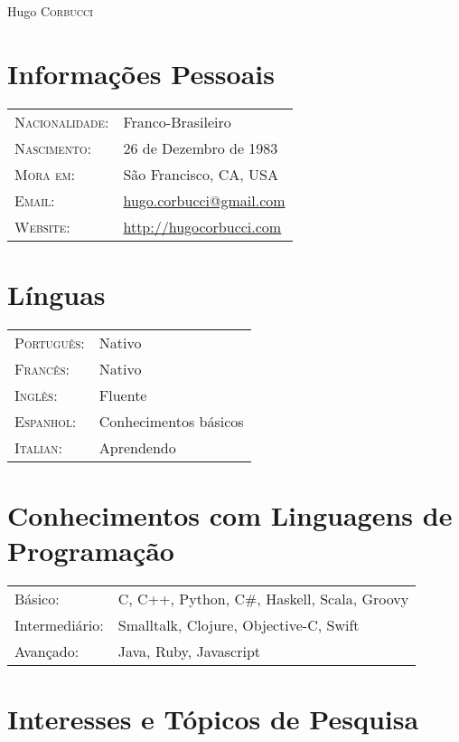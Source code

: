 \documentclass[letter,10pt]{article}
\begin{document}
\par{\centering
		{\Huge Hugo \textsc{Corbucci}
	}\bigskip\par}

\section{Informações Pessoais}

\begin{tabular}{p{2.5cm}l}
  \textsc{Nacionalidade:} & Franco-Brasileiro
  \\
  \textsc{Nascimento:} & 26 de Dezembro de 1983\\
  \textsc{Mora em:}   & São Francisco, CA, USA \\
  \textsc{Email:}     &
  \href{mailto:hugo.corbucci@gmail.com}{hugo.corbucci@gmail.com}\\
  \textsc{Website:} & \href{http://hugocorbucci.com}{http://hugocorbucci.com}
\end{tabular}

\section{Línguas}
\begin{tabular}{p{2.5cm}l}
 \textsc{Português:}&Nativo\\
 \textsc{Francês:}&Nativo\\
 \textsc{Inglês:}&Fluente\\
 \textsc{Espanhol:}&Conhecimentos básicos\\
 \textsc{Italian:}&Aprendendo\\
\end{tabular}

\section{Conhecimentos com Linguagens de Programação}
\begin{tabular}{p{2.5cm}l}
 Básico:& C, C++, Python, C\#, Haskell, Scala, Groovy\\
 Intermediário:& Smalltalk, Clojure, Objective-C, Swift\\
 Avançado:& Java, Ruby, Javascript\\
\end{tabular}

\section{Interesses e Tópicos de Pesquisa}
\end{document}
